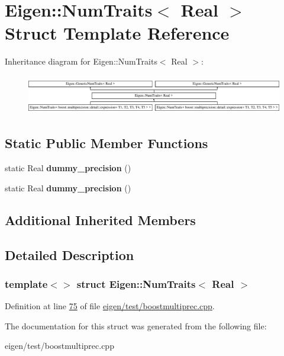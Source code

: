 \hypertarget{struct_eigen_1_1_num_traits_3_01_real_01_4}{}\section{Eigen\+:\+:Num\+Traits$<$ Real $>$ Struct Template Reference}
\label{struct_eigen_1_1_num_traits_3_01_real_01_4}
Inheritance diagram for Eigen\+:\+:Num\+Traits$<$ Real $>$\+:\begin{figure}[H]
\begin{center}
\leavevmode
\includegraphics[height=1.735537cm]{struct_eigen_1_1_num_traits_3_01_real_01_4}
\end{center}
\end{figure}
\subsection*{Static Public Member Functions}
\begin{DoxyCompactItemize}
\item 
\mbox{\label{struct_eigen_1_1_num_traits_3_01_real_01_4_a81991ed464e8cd7549cc50a6e3a60f17}} 
static Real {\bfseries dummy\+\_\+precision} ()
\item 
\mbox{\label{struct_eigen_1_1_num_traits_3_01_real_01_4_a81991ed464e8cd7549cc50a6e3a60f17}} 
static Real {\bfseries dummy\+\_\+precision} ()
\end{DoxyCompactItemize}
\subsection*{Additional Inherited Members}


\subsection{Detailed Description}
\subsubsection*{template$<$$>$\newline
struct Eigen\+::\+Num\+Traits$<$ Real $>$}



Definition at line \hyperlink{eigen_2test_2boostmultiprec_8cpp_source_l00075}{75} of file \hyperlink{eigen_2test_2boostmultiprec_8cpp_source}{eigen/test/boostmultiprec.\+cpp}.



The documentation for this struct was generated from the following file\+:\begin{DoxyCompactItemize}
\item 
eigen/test/boostmultiprec.\+cpp\end{DoxyCompactItemize}
